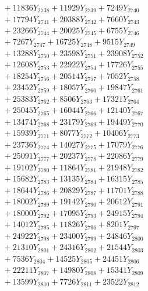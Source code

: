 \documentclass[a4paper,10pt]{article}
\begin{document}
{\begin{align}
&\;  + 11836 Y_{2738} + 11929 Y_{2739} + 7249 Y_{2740} \\[0.3ex]
&\;  + 17794 Y_{2741} + 20388 Y_{2742} + 7660 Y_{2743} \\[0.3ex]
&\;  + 23266 Y_{2744} + 20025 Y_{2745} + 6755 Y_{2746} \\[0.3ex]
&\;  + 7267 Y_{2747} + 16725 Y_{2748} + 9515 Y_{2749} \\[0.3ex]
&\;  + 13288 Y_{2750} + 23598 Y_{2751} + 23908 Y_{2752} \\[0.3ex]
&\;  + 12608 Y_{2753} + 22922 Y_{2754} + 17726 Y_{2755} \\[0.3ex]
&\;  + 18254 Y_{2756} + 20514 Y_{2757} + 7052 Y_{2758} \\[0.5ex]\allowbreak
&\;  + 23452 Y_{2759} + 18057 Y_{2760} + 19847 Y_{2761} \\[0.3ex]
&\;  + 25383 Y_{2762} + 8506 Y_{2763} + 17321 Y_{2764} \\[0.3ex]
&\;  + 25045 Y_{2765} + 16044 Y_{2766} + 12140 Y_{2767} \\[0.3ex]
&\;  + 13474 Y_{2768} + 23179 Y_{2769} + 19449 Y_{2770} \\[0.3ex]
&\;  + 15939 Y_{2771} + 8077 Y_{2772} + 10406 Y_{2773} \\[0.3ex]
&\;  + 23736 Y_{2774} + 14027 Y_{2775} + 17079 Y_{2776} \\[0.3ex]
&\;  + 25091 Y_{2777} + 20237 Y_{2778} + 22086 Y_{2779} \\[0.3ex]
&\;  + 19102 Y_{2780} + 11864 Y_{2781} + 21948 Y_{2782} \\[0.3ex]
&\;  + 15682 Y_{2783} + 13135 Y_{2784} + 16315 Y_{2785} \\[0.3ex]
&\;  + 18644 Y_{2786} + 20829 Y_{2787} + 11701 Y_{2788} \\[0.5ex]\allowbreak
&\;  + 18002 Y_{2789} + 19142 Y_{2790} + 20612 Y_{2791} \\[0.3ex]
&\;  + 18000 Y_{2792} + 17095 Y_{2793} + 24915 Y_{2794} \\[0.3ex]
&\;  + 14012 Y_{2795} + 11826 Y_{2796} + 8201 Y_{2797} \\[0.3ex]
&\;  + 24922 Y_{2798} + 23400 Y_{2799} + 24846 Y_{2800} \\[0.3ex]
&\;  + 21310 Y_{2801} + 24316 Y_{2802} + 21544 Y_{2803} \\[0.3ex]
&\;  + 7536 Y_{2804} + 14525 Y_{2805} + 24451 Y_{2806} \\[0.3ex]
&\;  + 22211 Y_{2807} + 14980 Y_{2808} + 15341 Y_{2809} \\[0.3ex]
&\;  + 13599 Y_{2810} + 7726 Y_{2811} + 23522 Y_{2812} \\[0.3ex]

\end{align}}
\end{document}

